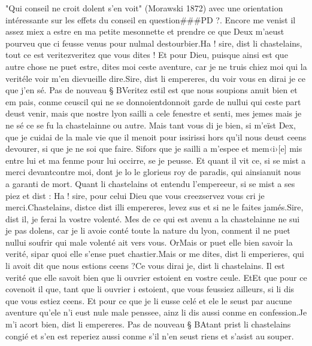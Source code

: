 \documentclass{article}
\begin{document}
\begin{pages}
      "Qui conseil ne croit dolent s'en voit" (Morawski 1872) avec une orientation intéressante sur les effets du conseil en question###PD ?. Encore me venist il assez miex a estre en ma petite 
      mesonnette et prendre ce que Deux m’aeust pourveu que ci feusse venus pour 
      nulmal destourbier.Ha ! sire, dist li chastelains, tout ce est 
      veritezveritez que vous dites ! 
   Et pour Dieu, puisque ainsi est que autre chose ne puet estre, dites moi ceste aventure, 
      car je ne truis chiez moi qui la veritéle voir m’en 
      dievueille dire.Sire, dist li empereres, du voir vous en dirai 
      je ce que j’en sé. \pend
\pstart Pas de nouveau § BVeritez 
   estil est que nous soupions anuit bien et em pais, 
   conme ceuscil qui ne se 
   donnoientdonnoit garde de nullui qui ceste part deust venir, 
   mais que nostre lyon sailli a cele fenestre et senti, 
      mes jemes mais je ne sé ce se fu 
      la chastelainne ou autre. 
   Mais tant vous di je bien, si m’eïst Dex, que je cuidai de la male vie que il menoit pour 
   issirissi hors qu’il nous deust ceens devourer, si que je ne soi que faire. 
   Sifors que je sailli a m’espee et 
   mem‹i›[e] mis entre lui et ma fenme 
   pour lui occirre, se je peusse. Et quant il vit ce, si se mist a merci 
   devantcontre moi, dont je lo le glorieus roy de paradis, qui 
   ainsianuit nous a garanti de mort. \pend
\pstart Quant li chastelains ot entendu 
   l’empereeur, si se mist a ses piez et dist :
   Ha ! sire, pour celui Dieu que vous 
      creezservez vous cri je merci.Chastelains, distce dist 
      illi empereres, levez sus et si ne le faites jamés.Sire, dist il, je ferai la vostre volenté. 
      Mes de ce qui est avenu a la chastelainne ne sui je pas dolens, car je li avoie conté toute
      la nature du lyon, conment il ne puet nullui soufrir qui male volenté ait vers vous. 
      OrMais or puet elle bien savoir la verité, 
      sipar quoi elle 
      s’ense puet chastier.Mais or me dites, dist li emperieres, 
      qui li avoit dit que nous estions ceens ?Ce vous dirai je, dist li chastelains. 
   Il est verité que elle savoit bien que li ouvrier estoient en vostre ceule. 
      EtEt que pour ce covenoit il que, tant que li ouvrier i estoient, 
      que vous feussiez ailleurs, si li dis que vous estiez ceens. Et pour ce que je li eusse celé et ele le seust par aucune 
      aventure qu’ele n’i eust nule male penssee, ainz li dis aussi conme en confession.Je m’i acort bien, 
      dist li empereres. \pend
\pstart Pas de nouveau § BAtant prist 
   li chastelains congié 
   et s’en est reperiez aussi conme s’il n’en seust riens et s’asist au souper. 

\end{pages}
\end{document}
